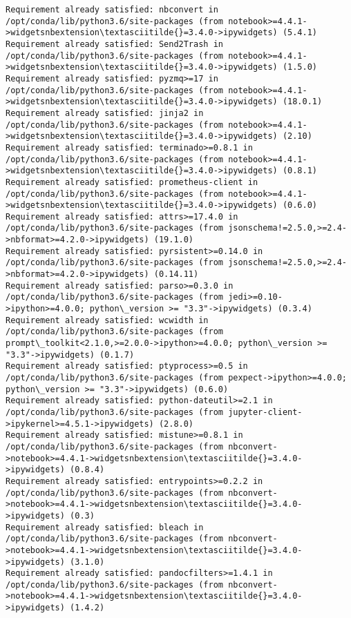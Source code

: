 \documentclass[11pt]{article}
\begin{document}
\begin{Verbatim}[commandchars=\\\{\}]
Requirement already satisfied: nbconvert in /opt/conda/lib/python3.6/site-packages (from notebook>=4.4.1->widgetsnbextension\textasciitilde{}=3.4.0->ipywidgets) (5.4.1)
Requirement already satisfied: Send2Trash in /opt/conda/lib/python3.6/site-packages (from notebook>=4.4.1->widgetsnbextension\textasciitilde{}=3.4.0->ipywidgets) (1.5.0)
Requirement already satisfied: pyzmq>=17 in /opt/conda/lib/python3.6/site-packages (from notebook>=4.4.1->widgetsnbextension\textasciitilde{}=3.4.0->ipywidgets) (18.0.1)
Requirement already satisfied: jinja2 in /opt/conda/lib/python3.6/site-packages (from notebook>=4.4.1->widgetsnbextension\textasciitilde{}=3.4.0->ipywidgets) (2.10)
Requirement already satisfied: terminado>=0.8.1 in /opt/conda/lib/python3.6/site-packages (from notebook>=4.4.1->widgetsnbextension\textasciitilde{}=3.4.0->ipywidgets) (0.8.1)
Requirement already satisfied: prometheus-client in /opt/conda/lib/python3.6/site-packages (from notebook>=4.4.1->widgetsnbextension\textasciitilde{}=3.4.0->ipywidgets) (0.6.0)
Requirement already satisfied: attrs>=17.4.0 in /opt/conda/lib/python3.6/site-packages (from jsonschema!=2.5.0,>=2.4->nbformat>=4.2.0->ipywidgets) (19.1.0)
Requirement already satisfied: pyrsistent>=0.14.0 in /opt/conda/lib/python3.6/site-packages (from jsonschema!=2.5.0,>=2.4->nbformat>=4.2.0->ipywidgets) (0.14.11)
Requirement already satisfied: parso>=0.3.0 in /opt/conda/lib/python3.6/site-packages (from jedi>=0.10->ipython>=4.0.0; python\_version >= "3.3"->ipywidgets) (0.3.4)
Requirement already satisfied: wcwidth in /opt/conda/lib/python3.6/site-packages (from prompt\_toolkit<2.1.0,>=2.0.0->ipython>=4.0.0; python\_version >= "3.3"->ipywidgets) (0.1.7)
Requirement already satisfied: ptyprocess>=0.5 in /opt/conda/lib/python3.6/site-packages (from pexpect->ipython>=4.0.0; python\_version >= "3.3"->ipywidgets) (0.6.0)
Requirement already satisfied: python-dateutil>=2.1 in /opt/conda/lib/python3.6/site-packages (from jupyter-client->ipykernel>=4.5.1->ipywidgets) (2.8.0)
Requirement already satisfied: mistune>=0.8.1 in /opt/conda/lib/python3.6/site-packages (from nbconvert->notebook>=4.4.1->widgetsnbextension\textasciitilde{}=3.4.0->ipywidgets) (0.8.4)
Requirement already satisfied: entrypoints>=0.2.2 in /opt/conda/lib/python3.6/site-packages (from nbconvert->notebook>=4.4.1->widgetsnbextension\textasciitilde{}=3.4.0->ipywidgets) (0.3)
Requirement already satisfied: bleach in /opt/conda/lib/python3.6/site-packages (from nbconvert->notebook>=4.4.1->widgetsnbextension\textasciitilde{}=3.4.0->ipywidgets) (3.1.0)
Requirement already satisfied: pandocfilters>=1.4.1 in /opt/conda/lib/python3.6/site-packages (from nbconvert->notebook>=4.4.1->widgetsnbextension\textasciitilde{}=3.4.0->ipywidgets) (1.4.2)

\end{Verbatim}
\end{document}
